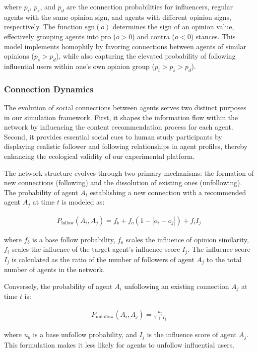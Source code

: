 where $p_i$, $p_s$, and $p_d$ are the connection probabilities for influencers, regular agents with the same opinion sign, and agents with different opinion signs, respectively. The function $\text{sgn}(o)$ determines the sign of an opinion value, effectively grouping agents into pro ($o > 0$) and contra ($o < 0$) stances. This model implements homophily by favoring connections between agents of similar opinions ($p_s > p_d$), while also capturing the elevated probability of following influential users within one's own opinion group ($p_i > p_s > p_d$).

\subsubsection{Connection Dynamics}

The evolution of social connections between agents serves two distinct purposes in our simulation framework. First, it shapes the information flow within the network by influencing the content recommendation process for each agent. Second, it provides essential social cues to human study participants by displaying realistic follower and following relationships in agent profiles, thereby enhancing the ecological validity of our experimental platform.

The network structure evolves through two primary mechanisms: the formation of new connections (following) and the dissolution of existing ones (unfollowing). The probability of agent $A_i$ establishing a new connection with a recommended agent $A_j$ at time $t$ is modeled as:

\begin{align}
    P_{\text{follow}}(A_i, A_j) =  f_b + f_o(1 - |o_i - o_j|) + f_i I_j
\end{align}

where $f_b$ is a base follow probability, $f_o$ scales the influence of opinion similarity, $f_i$ scales the influence of the target agent's influence score $I_j$. The influence score $I_j$ is calculated as the ratio of the number of followers of agent $A_j$ to the total number of agents in the network.

Conversely, the probability of agent $A_i$ unfollowing an existing connection $A_j$ at time $t$ is:

\begin{align}
    P_{\text{unfollow}}(A_i, A_j) = \frac{u_b}{1 + I_j}
\end{align}

where $u_b$ is a base unfollow probability, and $I_j$ is the influence score of agent $A_j$. This formulation makes it less likely for agents to unfollow influential users.

